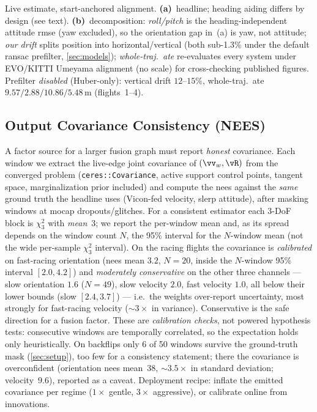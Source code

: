 \begin{table}[t]
\vspace{2pt}

\parbox{\columnwidth}{\raggedright\scriptsize Live estimate, start-anchored
  alignment.  \textbf{(a)}~headline; heading aiding differs by design (see
  text).  \textbf{(b)}~decomposition: \emph{roll/pitch} is the
  heading-independent attitude \ac{rmse} (yaw excluded), so the orientation
  gap in~(a) is yaw, not attitude; \emph{our drift} splits position into
  horizontal/vertical (both sub-1.3\% under the default \ac{ransac} prefilter,
  \autoref{sec:models}); \emph{whole-traj.\ \ac{ate}} re-evaluates every system
  under EVO/KITTI Umeyama alignment (no scale) for cross-checking published
  figures.  Prefilter \emph{disabled} (Huber-only): vertical drift
  $12$--$15\%$, whole-traj.\ \ac{ate} $9.57/2.88/10.86/5.48$\,m (flights~1--4).\par}
\end{table}

\subsection{Output Covariance Consistency (NEES)}
\label{sec:nees}
A factor source for a larger fusion graph must report \emph{honest}
covariance.  Each window we extract the live-edge joint covariance of
$(\vv_w, \vR)$ from the converged problem (\texttt{ceres::Covariance},
active support control points, tangent space, marginalization prior
included) and compute the \ac{nees} against the \emph{same} ground truth the
headline uses (Vicon-fed velocity, slerp attitude), after masking windows at
\ac{mocap} dropouts/glitches.  For a consistent estimator each 3-DoF block is
$\chi^2_3$ with \emph{mean}~3; we report the per-window mean and, as its
spread depends on the window count $N$, the 95\% interval for the
$N$-window mean (not the wide per-sample $\chi^2_3$ interval).
On the racing flights the covariance is \emph{calibrated} on fast-racing
orientation (\ac{nees} mean $3.2$, $N{=}20$, inside the $N$-window 95\%
interval $[2.0,4.2]$) and \emph{moderately conservative} on the other three
channels --- slow orientation $1.6$ ($N{=}49$), slow velocity $2.0$, fast
velocity $1.0$, all below their lower bounds (slow $[2.4,3.7]$) --- i.e.\ the
weights over-report uncertainty, most strongly for fast-racing velocity
(${\sim}3\times$ in variance).  Conservative is the safe direction for a fusion
factor.  These are \emph{calibration checks}, not powered hypothesis tests:
consecutive windows are temporally correlated, so the expectation holds only
heuristically.  On backflips only 6 of 50 windows
survive the ground-truth mask (\autoref{sec:setup}), too few for a
consistency statement; there the covariance is overconfident (orientation
\ac{nees} mean~38, ${\sim}3.5\times$ in standard deviation; velocity~9.6),
reported as a caveat.  Deployment recipe: inflate the emitted covariance per
regime ($1\times$ gentle, $3\times$ aggressive), or calibrate online from
innovations.

